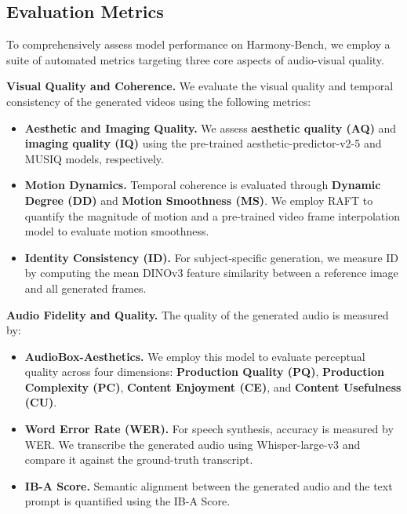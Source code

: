 \subsection{Evaluation Metrics}
\label{sec:evaluation_metrics}

To comprehensively assess model performance on Harmony-Bench, we employ a suite of automated metrics targeting three core aspects of audio-visual quality.

\noindent\textbf{Visual Quality and Coherence.} We evaluate the visual quality and temporal consistency of the generated videos using the following metrics:
\begin{itemize}
    \item \textbf{Aesthetic and Imaging Quality.} We assess \textbf{aesthetic quality (AQ)} and \textbf{imaging quality (IQ)} using the pre-trained aesthetic-predictor-v2-5\cite{Aesthetic} and MUSIQ\cite{ke2021musiq} models, respectively.
    \item \textbf{Motion Dynamics.} Temporal coherence is evaluated through \textbf{Dynamic Degree (DD)} and \textbf{Motion Smoothness (MS)}\cite{huang2024vbench}. We employ RAFT\cite{teed2020raft} to quantify the magnitude of motion and a pre-trained video frame interpolation model to evaluate motion smoothness.
    \item \textbf{Identity Consistency (ID).} For subject-specific generation, we measure ID by computing the mean DINOv3\cite{simeoni2025dinov3} feature similarity between a reference image and all generated frames.
\end{itemize}

\noindent\textbf{Audio Fidelity and Quality.} The quality of the generated audio is measured by:
\begin{itemize}
    \item \textbf{AudioBox-Aesthetics.}\cite{tjandra2025AudioBox-Aesthetics} We employ this model to evaluate perceptual quality across four dimensions: \textbf{Production Quality (PQ)}, \textbf{Production Complexity (PC)}, \textbf{Content Enjoyment (CE)}, and \textbf{Content Usefulness (CU)}.
    \item \textbf{Word Error Rate (WER).} For speech synthesis, accuracy is measured by WER. We transcribe the generated audio using Whisper-large-v3\cite{radford2023whisper} and compare it against the ground-truth transcript.
    \item \textbf{IB-A Score.} Semantic alignment between the generated audio and the text prompt is quantified using the IB-A Score\cite{girdhar2023imagebind}.
\end{itemize}

